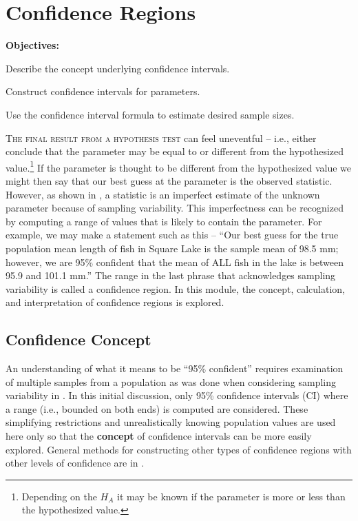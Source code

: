 \documentclass[10pt,openany]{book}\usepackage[]{graphicx}\usepackage[]{color}
\begin{document}
\chapter{Confidence Regions} \label{chap:ConfidenceRegions}
\begin{ChapObj}{\boxwidth}
  \textbf{Objectives:}
  \begin{Enumerate}
    \item Describe the concept underlying confidence intervals.
    \item Construct confidence intervals for parameters.
    \item Use the confidence interval formula to estimate desired sample sizes.
  \end{Enumerate}
\end{ChapObj}

\minitoc
\vspace{24pt}



\lettrine{T}{he final result from a hypothesis test}  can feel uneventful -- i.e., either conclude that the parameter may be equal to or different from the hypothesized value.\footnote{Depending on the $H_{A}$ it may be known if the parameter is more or less than the hypothesized value.}  If the parameter is thought to be different from the hypothesized value we might then say that our best guess at the parameter is the observed statistic.  However, as shown in , a statistic is an imperfect estimate of the unknown parameter because of sampling variability.  This imperfectness can be recognized by computing a range of values that is likely to contain the parameter.  For example, we may make a statement such as this -- ``Our best guess for the true population mean length of fish in Square Lake is the sample mean of 98.5 mm; however, we are 95\% confident that the mean of ALL fish in the lake is between 95.9 and 101.1 mm.''  The range in the last phrase that acknowledges sampling variability is called a confidence region.  In this module, the concept, calculation, and interpretation of confidence regions is explored.

\section{Confidence Concept} \label{sect:CIconcept}
\vspace{-14pt}
An understanding of what it means to be ``95\% confident'' requires examination of multiple samples from a population as was done when considering sampling variability in . In this initial discussion, only 95\% confidence intervals (CI) where a range (i.e., bounded on both ends) is computed are considered. These simplifying restrictions and unrealistically knowing population values are used here only so that the \textbf{concept} of confidence intervals can be more easily explored. General methods for constructing other types of confidence regions with other levels of confidence are in .
\end{document}
